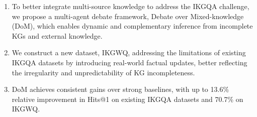 \begin{enumerate}
    \item To better integrate multi-source knowledge to address the IKGQA challenge, we propose a multi-agent debate framework, Debate over Mixed-knowledge (DoM), which enables dynamic and complementary inference from incomplete KGs and external knowledge.
    \item We construct a new dataset, IKGWQ, addressing the limitations of existing IKGQA datasets by introducing real-world factual updates, better reflecting the irregularity and unpredictability of KG incompleteness.
    \item DoM achieves consistent gains over strong baselines, with up to 13.6\% relative improvement in Hits@1 on existing IKGQA datasets and 70.7\% on IKGWQ.
\end{enumerate}



